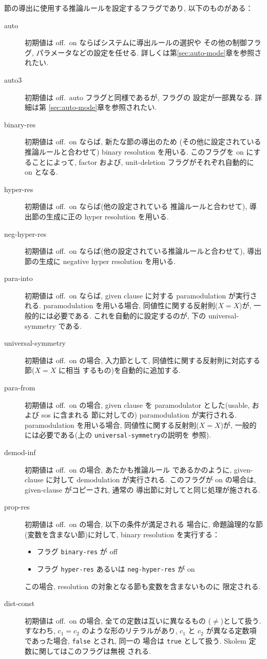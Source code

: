 節の導出に使用する推論ルールを設定するフラグであり,
以下のものがある：
\begin{description}
\item[auto] 初期値は off.\ on ならばシステムに導出ルールの選択や
  その他の制御フラグ, パラメータなどの設定を任せる.
  詳しくは第\ref{sec:auto-mode}章を参照されたい.

\item[auto3] 初期値は off.\ auto フラグと同様であるが, フラグの
  設定が一部異なる. 詳細は第 \ref{sec:auto-mode}章を参照されたい.

\item[binary-res] 初期値は off.\ on ならば, 新たな節の導出のため
  (その他に設定されている推論ルールと合わせて) 
  binary resolution を用いる. このフラグを on にすることによって,
  factor および, unit-deletion フラグがそれぞれ自動的に on となる.
\item[hyper-res] 初期値は off.\ on ならば(他の設定されている
  推論ルールと合わせて), 導出節の生成に正の hyper resolution を用いる.
\item[neg-hyper-res] 初期値は off.\
  on ならば(他の設定されている推論ルールと合わせて), 導出節の生成に negative
  hyper resolution を用いる.
\item[para-into] 初期値は off.\ 
  on ならば, given clause に対する paramodulation が実行される.
  paramodulation を用いる場合, 同値性に関する反射則($X = X$)が,
  一般的には必要である. これを自動的に設定するのが, 下の universal-symmetry
  である.
\item[universal-symmetry] 初期値は off.\ on の場合,
  入力節として, 同値性に関する反射則に対応する節($ X = X $ に相当
  するもの)を自動的に追加する.
\item[para-from] 初期値は off.\ on の場合,
  given clause を paramodulator とした(usable, および sos に含まれる
  節に対しての) paramodulation が実行される.
  paramodulation を用いる場合, 同値性に関する反射則($X = X$)が,
  一般的には必要である(上の \texttt{universal-symmetry}の説明を
  参照).
\item[demod-inf] 初期値は off.\ on の場合, あたかも推論ルール
  であるかのように, given-clause に対して demodulation が実行される.
  このフラグが on の場合は, given-clause がコピーされ, 通常の
  導出節に対してと同じ処理が施される.
\item[prop-res] 初期値は off.\ on の場合, 以下の条件が満足される
  場合に, 命題論理的な節(変数を含まない節)に対して, 
  binary resolution を実行する：
  \begin{itemize}
  \item フラグ \texttt{binary-res} が off
  \item フラグ \texttt{hyper-res} あるいは \texttt{neg-hyper-res} が on
  \end{itemize}
  この場合, resolution の対象となる節も変数を含まないものに
  限定される.
\item[dist-const] 初期値は off.\ on の場合, 全ての定数は互いに異なるもの
  ($\neq$)として扱う.  
  すなわち, $c_1=c_2$ のような形のリテラルがあり,
  $c_1$ と $c_2$ が異なる定数項であった場合, \texttt{false} とされ, 同一の
  場合は \texttt{true} として扱う. Skolem 定数に関してはこのフラグは無視
  される. 
\end{description}


